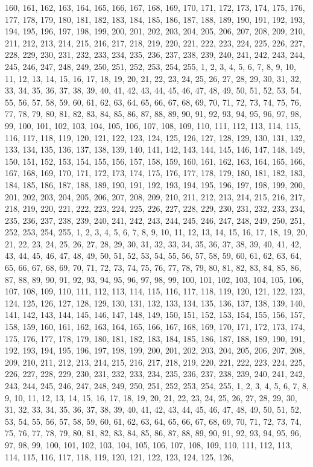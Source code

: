 160, 161, 162, 163, 164, 165, 166, 167, 168, 169, 170, 171, 172, 173, 174, 175, 176, 177, 178, 179, 180, 181, 182, 183, 184, 185, 186, 187, 188, 189, 190, 191, 192, 193, 194, 195, 196, 197, 198, 199, 200, 201, 202, 203, 204, 205, 206, 207, 208, 209, 210, 211, 212, 213, 214, 215, 216, 217, 218, 219, 220, 221, 222, 223, 224, 225, 226, 227, 228, 229, 230, 231, 232, 233, 234, 235, 236, 237, 238, 239, 240, 241, 242, 243, 244, 245, 246, 247, 248, 249, 250, 251, 252, 253, 254, 255, 1, 2, 3, 4, 5, 6, 7, 8, 9, 10, 11, 12, 13, 14, 15, 16, 17, 18, 19, 20, 21, 22, 23, 24, 25, 26, 27, 28, 29, 30, 31, 32, 33, 34, 35, 36, 37, 38, 39, 40, 41, 42, 43, 44, 45, 46, 47, 48, 49, 50, 51, 52, 53, 54, 55, 56, 57, 58, 59, 60, 61, 62, 63, 64, 65, 66, 67, 68, 69, 70, 71, 72, 73, 74, 75, 76, 77, 78, 79, 80, 81, 82, 83, 84, 85, 86, 87, 88, 89, 90, 91, 92, 93, 94, 95, 96, 97, 98, 99, 100, 101, 102, 103, 104, 105, 106, 107, 108, 109, 110, 111, 112, 113, 114, 115, 116, 117, 118, 119, 120, 121, 122, 123, 124, 125, 126, 127, 128, 129, 130, 131, 132, 133, 134, 135, 136, 137, 138, 139, 140, 141, 142, 143, 144, 145, 146, 147, 148, 149, 150, 151, 152, 153, 154, 155, 156, 157, 158, 159, 160, 161, 162, 163, 164, 165, 166, 167, 168, 169, 170, 171, 172, 173, 174, 175, 176, 177, 178, 179, 180, 181, 182, 183, 184, 185, 186, 187, 188, 189, 190, 191, 192, 193, 194, 195, 196, 197, 198, 199, 200, 201, 202, 203, 204, 205, 206, 207, 208, 209, 210, 211, 212, 213, 214, 215, 216, 217, 218, 219, 220, 221, 222, 223, 224, 225, 226, 227, 228, 229, 230, 231, 232, 233, 234, 235, 236, 237, 238, 239, 240, 241, 242, 243, 244, 245, 246, 247, 248, 249, 250, 251, 252, 253, 254, 255, 1, 2, 3, 4, 5, 6, 7, 8, 9, 10, 11, 12, 13, 14, 15, 16, 17, 18, 19, 20, 21, 22, 23, 24, 25, 26, 27, 28, 29, 30, 31, 32, 33, 34, 35, 36, 37, 38, 39, 40, 41, 42, 43, 44, 45, 46, 47, 48, 49, 50, 51, 52, 53, 54, 55, 56, 57, 58, 59, 60, 61, 62, 63, 64, 65, 66, 67, 68, 69, 70, 71, 72, 73, 74, 75, 76, 77, 78, 79, 80, 81, 82, 83, 84, 85, 86, 87, 88, 89, 90, 91, 92, 93, 94, 95, 96, 97, 98, 99, 100, 101, 102, 103, 104, 105, 106, 107, 108, 109, 110, 111, 112, 113, 114, 115, 116, 117, 118, 119, 120, 121, 122, 123, 124, 125, 126, 127, 128, 129, 130, 131, 132, 133, 134, 135, 136, 137, 138, 139, 140, 141, 142, 143, 144, 145, 146, 147, 148, 149, 150, 151, 152, 153, 154, 155, 156, 157, 158, 159, 160, 161, 162, 163, 164, 165, 166, 167, 168, 169, 170, 171, 172, 173, 174, 175, 176, 177, 178, 179, 180, 181, 182, 183, 184, 185, 186, 187, 188, 189, 190, 191, 192, 193, 194, 195, 196, 197, 198, 199, 200, 201, 202, 203, 204, 205, 206, 207, 208, 209, 210, 211, 212, 213, 214, 215, 216, 217, 218, 219, 220, 221, 222, 223, 224, 225, 226, 227, 228, 229, 230, 231, 232, 233, 234, 235, 236, 237, 238, 239, 240, 241, 242, 243, 244, 245, 246, 247, 248, 249, 250, 251, 252, 253, 254, 255, 1, 2, 3, 4, 5, 6, 7, 8, 9, 10, 11, 12, 13, 14, 15, 16, 17, 18, 19, 20, 21, 22, 23, 24, 25, 26, 27, 28, 29, 30, 31, 32, 33, 34, 35, 36, 37, 38, 39, 40, 41, 42, 43, 44, 45, 46, 47, 48, 49, 50, 51, 52, 53, 54, 55, 56, 57, 58, 59, 60, 61, 62, 63, 64, 65, 66, 67, 68, 69, 70, 71, 72, 73, 74, 75, 76, 77, 78, 79, 80, 81, 82, 83, 84, 85, 86, 87, 88, 89, 90, 91, 92, 93, 94, 95, 96, 97, 98, 99, 100, 101, 102, 103, 104, 105, 106, 107, 108, 109, 110, 111, 112, 113, 114, 115, 116, 117, 118, 119, 120, 121, 122, 123, 124, 125, 126, 
